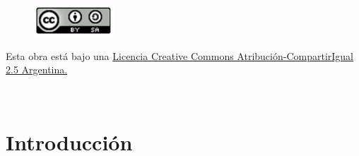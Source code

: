 \documentclass[10pt,a4paper, twoside]{report}
\begin{document}
\makeatletter
\author{Cristian Guerrero Córdova}
\makeatother





\begin{center}
\begin{figure}[!htb]
    \centering
    \includegraphics[width=3cm, keepaspectratio=true]{imagenes/Logos/creativecommons.png}
\end{figure}
\vspace*{-0.5cm}
Esta obra está bajo una \href{http://creativecommons.org/licenses/by-sa/2.5/ar/}{Licencia Creative Commons Atribución-CompartirIgual 2.5 Argentina.}
\end{center}





\tabladecontenidos


\newpage
$\ $
\thispagestyle{empty} %
%

\setcounter{page}{1}

\chapter{Introducción}
\label{chap:introduccion}
\end{document}
